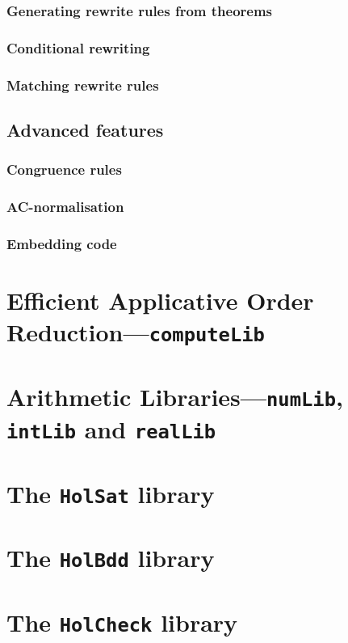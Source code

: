 \subsubsection{Generating rewrite rules from theorems}

\subsubsection{Conditional rewriting}


\subsubsection{Matching rewrite rules}
\label{sec:simp-homatch}



\subsection{Advanced features}
\label{sec:advanced-simplifier}

\subsubsection{Congruence rules}
\label{sec:simp-congruences}

\subsubsection{AC-normalisation}

\subsubsection{Embedding code}


\section{Efficient Applicative Order Reduction---\texttt{computeLib}}
\label{sec:computeLib}

\section{Arithmetic Libraries---\texttt{numLib}, \texttt{intLib} and \texttt{realLib}}
\label{sec:numLib}

\section{The \texttt{HolSat} library}\label{sec:HolSatLib}
\section{The \texttt{HolBdd} library}\label{sec:HolBddLib}
\section{The \texttt{HolCheck} library}\label{sec:HolCheckLib}


